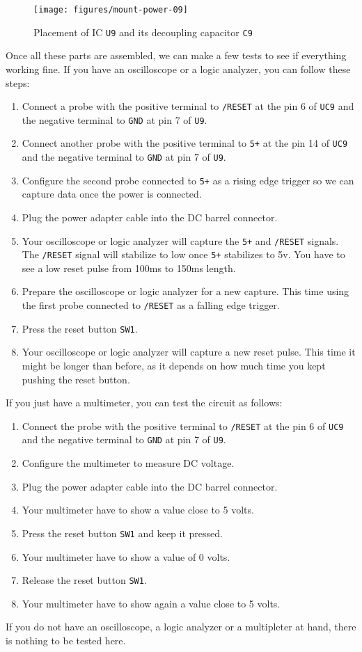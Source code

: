 \begin{figure}[htbp]
  \centering
  \texttt{[image: figures/mount-power-09]}
  \caption{Placement of IC {\tt U9} and its decoupling capacitor {\tt C9}}
  \label{fig:mount-power-09}
\end{figure}

Once all these parts are assembled, we can make a few tests to see if everything working fine. If you have an oscilloscope or a logic analyzer, you can follow these steps:

\begin{enumerate}
  \item Connect a probe with the positive terminal to {\tt /RESET} at the pin 6 of {\tt UC9} and the negative terminal to {\tt GND} at pin 7 of {\tt U9}.
  \item Connect another probe with the positive terminal to {\tt 5+} at the pin 14 of {\tt UC9} and the negative terminal to {\tt GND} at pin 7 of {\tt U9}.
  \item Configure the second probe connected to {\tt 5+} as a rising edge trigger so we can capture data once the power is connected.
  \item Plug the power adapter cable into the DC barrel connector.
  \item Your oscilloscope or logic analyzer will capture the {\tt 5+} and {\tt /RESET} signals. The {\tt /RESET} signal will stabilize to low once {\tt 5+} stabilizes to 5v. You have to see a low reset pulse from 100ms to 150ms length.
  \item Prepare the oscilloscope or logic analyzer for a new capture. This time using the first probe connected to {\tt /RESET} as a falling edge trigger.
  \item Press the reset button {\tt SW1}.
  \item Your oscilloscope or logic analyzer will capture a new reset pulse. This time it might be longer than before, as it depends on how much time you kept pushing the reset button.
\end{enumerate}

If you just have a multimeter, you can test the circuit as follows:

\begin{enumerate}
  \item Connect the probe with the positive terminal to {\tt /RESET} at the pin 6 of {\tt UC9} and the negative terminal to {\tt GND} at pin 7 of {\tt U9}.
  \item Configure the multimeter to measure DC voltage.
  \item Plug the power adapter cable into the DC barrel connector.
  \item Your multimeter have to show a value close to 5 volts.
  \item Press the reset button {\tt SW1} and keep it pressed.
  \item Your multimeter have to show a value of 0 volts.
  \item Release the reset button {\tt SW1}.
  \item Your multimeter have to show again a value close to 5 volts.
\end{enumerate}

If you do not have an oscilloscope, a logic analyzer or a multipleter at hand, there is nothing to be tested here.

